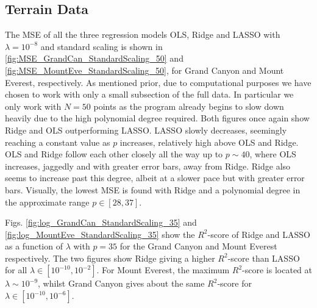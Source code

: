 \documentclass[%
reprint,
amsmath,amssymb,
aps,
pra,
]{revtex4-2}
\begin{document}
\subsection{Terrain Data}
The MSE of all the three regression models OLS, Ridge and LASSO with \(\lambda=10^{-8}\) and standard scaling is shown in \ref{fig:MSE_GrandCan_StandardScaling_50} and \ref{fig:MSE_MountEve_StandardScaling_50}, for Grand Canyon and Mount Everest, respectively. As mentioned prior, due to computational purposes we have chosen to work with only a small subsection of the full data. In particular we only work with $N=50$ points as the program already begins to slow down heavily due to the high polynomial degree required.
Both figures once again show Ridge and OLS outperforming LASSO. LASSO slowly decreases, seemingly reaching a constant value as \(p\) increases, relatively high above OLS and Ridge. OLS and Ridge follow each other closely all the way up to \(p\sim 40\), where OLS increases, jaggedly and with greater error bars, away from Ridge. Ridge also seems to increase past this degree, albeit at a slower pace but with greater error bars. Visually, the lowest MSE is found with Ridge and a polynomial degree in the approximate range \(p\in[28,37]\). 

Figs. \ref{fig:log_GrandCan_StandardScaling_35} and \ref{fig:log_MountEve_StandardScaling_35} show the \(R^2\)-score of Ridge and LASSO as a function of \(\lambda\) with \(p=35\) for the Grand Canyon and Mount Everest respectively. The two figures show Ridge giving a higher \(R^2\)-score than LASSO for all \(\lambda\in[10^{-10}, 10^{-2}]\). For Mount Everest, the maximum \(R^2\)-score is located at \(\lambda\sim 10^{-9}\), whilst Grand Canyon gives about the same \(R^2\)-score for \(\lambda\in[10^{-10}, 10^{-6}]\).
\end{document}
